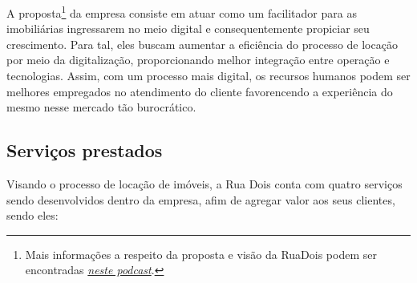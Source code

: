 A proposta\footnote{Mais informações a respeito da proposta e visão da RuaDois podem
ser encontradas
\href{https://open.spotify.com/episode/2jYKPCPLCIdDWwxpR0theT?si=dT6WUG7JSEGJH3mVVIJitQ}
{\textit{neste podcast}}.}
da empresa consiste em atuar como um facilitador para as imobiliárias
ingressarem no meio digital e consequentemente propiciar seu crescimento. Para tal,
eles buscam aumentar a eficiência do processo de locação por meio da digitalização,
proporcionando melhor integração entre operação e tecnologias. Assim, com um processo
mais digital, os recursos humanos podem ser melhores empregados no atendimento do
cliente favorencendo a experiência do mesmo nesse mercado tão burocrático.


%
%
%


\subsection{Serviços prestados}

Visando o processo de locação de imóveis, a Rua Dois conta com quatro serviços
sendo desenvolvidos dentro da empresa, afim de agregar valor aos seus clientes,
sendo eles:

